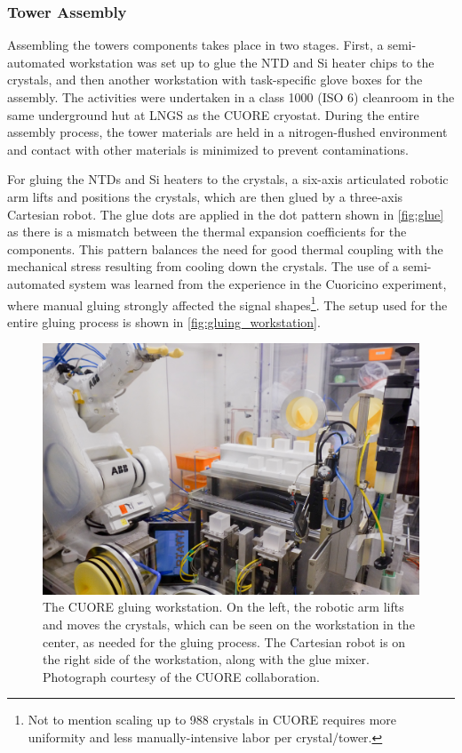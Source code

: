 \subsubsection{Tower Assembly}
\label{ssec:Tower Assembly}
Assembling the towers components takes place in two stages.
First, a semi-automated workstation was set up to glue the NTD and Si heater chips to the crystals, and then another workstation with task-specific glove boxes for the assembly.
The activities were undertaken in a class 1000 (ISO 6) cleanroom in the same underground hut at LNGS as the CUORE cryostat.
During the entire assembly process, the tower materials are held in a nitrogen-flushed environment and contact with other materials is minimized to prevent contaminations.

For gluing the NTDs and Si heaters to the crystals, a six-axis articulated robotic arm lifts and positions the crystals, which are then glued by a three-axis Cartesian robot.
The glue dots are applied in the dot pattern shown in \autoref{fig:glue} as there is a mismatch between the thermal expansion coefficients for the components.
This pattern balances the need for good thermal coupling with the mechanical stress resulting from cooling down the crystals.
The use of a semi-automated system was learned from the experience in the Cuoricino experiment, where manual gluing strongly affected the signal shapes\footnote{Not to mention scaling up to 988 crystals in CUORE requires more uniformity and less manually-intensive labor per crystal/tower.}.
The setup used for the entire gluing process is shown in \autoref{fig:gluing_workstation}.

\begin{figure}[htbp]
    \centering
    \includegraphics[width=0.7\linewidth]{Figures/cuore_gluing_pic1.jpg}
    \caption[The CUORE gluing workstation]
    {The CUORE gluing workstation.
    On the left, the robotic arm lifts and moves the crystals, which can be seen on the workstation in the center, as needed for the gluing process.
    The Cartesian robot is on the right side of the workstation, along with the glue mixer.
    Photograph courtesy of the CUORE collaboration.}
    \label{fig:gluing_workstation}
\end{figure}

